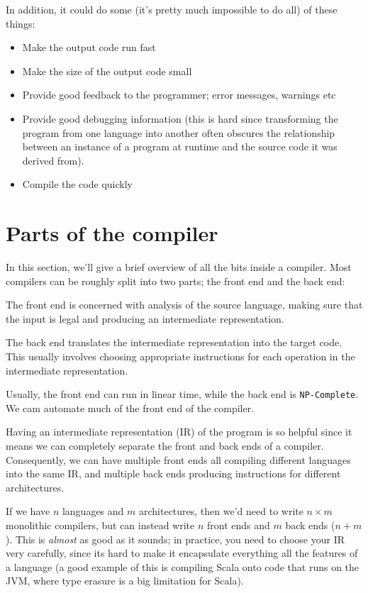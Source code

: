 In addition, it could do some (it's pretty much impossible to do all) of these
things:

\begin{itemize}
  \item Make the output code run fast
  \item Make the size of the output code small
  \item Provide good feedback to the programmer; error messages, warnings etc
  \item Provide good debugging information (this is hard since transforming the
  program from one language into another often obscures the relationship between
  an instance of a program at runtime and the source code it was derived from).
  \item Compile the code quickly
\end{itemize}

\section{Parts of the compiler}

In this section, we'll give a brief overview of all the bits inside a compiler.
Most compilers can be roughly split into two parts; the front end and the back
end:

\begin{description}
  \item The front end is concerned with analysis of the source language, making
  sure that the input is legal and producing an intermediate representation.
  \item The back end translates the intermediate representation into the target
  code. This usually involves choosing appropriate instructions for each 
  operation in the intermediate representation.
\end{description}

Usually, the front end can run in linear time, while the back end is
\texttt{NP-Complete}. We cam automate much of the front end of the compiler.

Having an intermediate representation (IR) of the program is so helpful since it
means we can completely separate the front and back ends of a compiler.
Consequently, we can have multiple front ends all compiling different languages
into the same IR, and multiple back ends producing instructions for different
architectures.

If we have $n$ languages and $m$ architectures, then we'd need to write $n
\times m$ monolithic compilers, but can instead write $n$ front ends and $m$
back ends ($n+ m$). This is \textit{almost} as good as it sounds; in practice,
you need to choose your IR very carefully, since its hard to make it encapsulate
everything all the features of a language (a good example of this is compiling
Scala onto code that runs on the JVM, where type erasure is a big limitation for
Scala).

